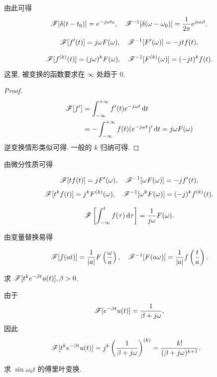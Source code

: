 \documentclass[nocolor,theme=doremi,lang=cn,11pt,chinese,twoside,openright,usesamecnt]{elegantbook}
\newenvironment{block}[1]{\begin{tcolorbox}[blockstyle,title=#1]}{\end{tcolorbox}}
\begin{document}
由此可得
\[\mathscr{F}[\delta(t-t_0)]=e^{-j\omega t_0},\quad
\mathscr{F}^{-1}[\delta(\omega-\omega_0)]=\dfrac1{2\pi}e^{j\omega_0 t}.\]

\begin{block}{微分性质}
	\[\mathscr{F}[f'(t)]=j\omega F(\omega),\quad
	\mathscr{F}^{-1}[F'(\omega)]=-jtf(t),\]

	\[\mathscr{F}[f^{(k)}(t)]=(j\omega)^k F(\omega),\quad
	\mathscr{F}^{-1}[F^{(k)}(\omega)]=(-jt)^kf(t).\]
	这里, 被变换的函数要求在 $\infty$ 处趋于 $0$.
\end{block}

\begin{proof}
	\begin{align*}
		\mathscr{F}[f']&=\int_{-\infty}^{+\infty}f'(t)e^{-j\omega t}\,\mathrm{d} t\\
		&=-\int_{-\infty}^{+\infty}f(t)(e^{-j\omega t})'\,\mathrm{d} t=j\omega F(\omega)
	\end{align*}
	{逆变换情形类似可得. 一般的 $k$ 归纳可得.\qedhere}
\end{proof}

由微分性质可得
\begin{block}{乘多项式性质}
	\[\mathscr{F}[tf(t)]=jF'(\omega),\quad
	\mathscr{F}^{-1}[\omega F(\omega)]=-jf'(t),\]
	\[\mathscr{F}[t^kf(t)]=j^kF^{(k)}(\omega),\quad
	\mathscr{F}^{-1}[\omega^kF(\omega)]=(-j)^kf^{(k)}(t).\]
\end{block}

\begin{block}{积分性质}
	\[\mathscr{F}\left[\int_{-\infty}^t f(\tau)\,\mathrm{d}\tau\right]=\frac1{j\omega}F(\omega).\]
\end{block}

由变量替换易得
\begin{block}{相似性质}
	\[\mathscr{F}[f(at)]=\frac1{|a|}F\left(\frac\omega a\right),\quad
	\mathscr{F}^{-1}[F(a\omega)]=\frac1{|a|}f\left(\frac t a\right).\]
\end{block}

\begin{example}
	求 $\mathscr{F}[t^k e^{-\beta t}u(t)],\beta>0$.
\end{example}

\begin{solution}
		由于
		\[\mathscr{F}[e^{-\beta t}u(t)]=\frac{1}{\beta+j\omega},\]
	{因此
		\begin{align*}
			\mathscr{F}[t^ke^{-\beta t}u(t)]&=j^k\left(\frac1{\beta+j\omega}\right)^{(k)}
			=\frac{k!}{(\beta+j\omega)^{k+1}}.
		\end{align*}
	}
\end{solution}

\begin{example}
	求 $\sin{\omega_0 t}$ 的傅里叶变换.
\end{example}
\end{document}

